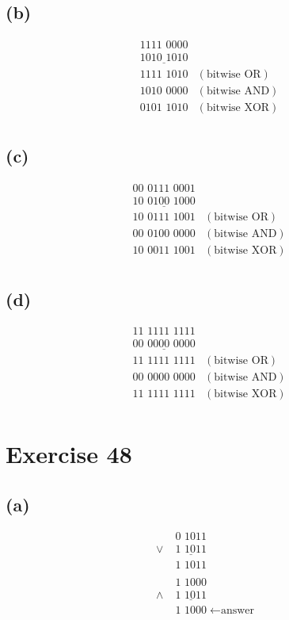 \documentclass{article}
\begin{document}
	\subsection{(b)}
\begin{align*}
	&\text{1111 0000} & \\
	&\underline{\text{1010 1010}} & \\
	&\text{1111 1010} & (\text{bitwise OR}) \\
	&\text{1010 0000} & (\text{bitwise AND}) \\
	&\text{0101 1010} & (\text{bitwise XOR}) \\
\end{align*}
	
		\subsection{(c)}
	\begin{align*}
		&\text{00 0111 0001} & \\
		&\underline{\text{10 0100 1000}} & \\
		&\text{10 0111 1001} & (\text{bitwise OR}) \\
		&\text{00 0100 0000} & (\text{bitwise AND}) \\
		&\text{10 0011 1001} & (\text{bitwise XOR}) \\
	\end{align*}

		\subsection{(d)}
\begin{align*}
	&\text{11 1111 1111} & \\
	&\underline{\text{00 0000 0000}} & \\
	&\text{11 1111 1111} & (\text{bitwise OR}) \\
	&\text{00 0000 0000} & (\text{bitwise AND}) \\
	&\text{11 1111 1111} & (\text{bitwise XOR}) \\
\end{align*}

\section{Exercise 48}
\subsection{(a)}
\begin{align*}
	&\text{0 1011} \\
	\lor \; &\underline{\text{1 1011}} \\
	&\text{1 1011} \\
	& \\
	&\text{1 1000} \\
	\land \; &\underline{\text{1 1011}} \\
	&\text{1 1000} \; \leftarrow \text{answer}
\end{align*}
\end{document}
